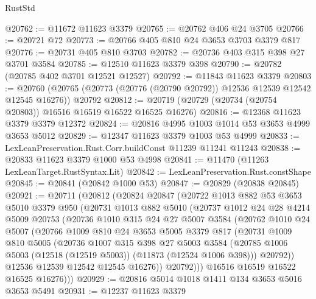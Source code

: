 \begin{lexlean}{RustStd}
\begin{coremodule}
@20762 := @11672 @11623 @3379
@20765 := @20762 @406 @24 @3705
@20766 := @20721 @72
@20773 := @20766 @405 @810 @24 @3653 @3703 @3379 @817
@20776 := @20731 @405 @810 @3703
@20782 := @20736 @403 @315 @398 @27 @3701 @3584
@20785 := @12510 @11623 @3379 @398
@20790 := @20782 (@20785 @402 @3701 @12521 @12527)
@20792 := @11843 @11623 @3379
@20803 := @20760
    (@20765 (@20773 (@20776 (@20790 @20792)) @12536 @12539 @12542 @12545 @16276))
    @20792
@20812 := @20719 (@20729 (@20734 (@20754 @20803)) @16516 @16519 @16522 @16525 @16276)
@20816 := @12368 @11623 @3379 @3379 @12372
@20824 := @20816 @4995 @1003 @1014 @53 @3653 @4999 @3653 @5012
@20829 := @12347 @11623 @3379 @1003 @53 @4999
@20833 := LexLeanPreservation.Rust.Corr.buildConst @11239 @11241 @11243
@20838 := @20833 @11623 @3379 @1000 @53 @4998
@20841 := @11470 (@11263 LexLeanTarget.RustSyntax.Lit)
@20842 := LexLeanPreservation.Rust.constShape
@20845 := @20841 (@20842 @1000 @53)
@20847 := @20829 (@20838 @20845)
@20921 := @20711
    (@20812
      (@20824
        @20847
        (@20722
          @1013
          @882
          @53
          @3653
          @5010
          @3379
          @950
          (@20731
            @1013
            @882
            @5010
            (@20737
              @1012
              @24
              @28
              @4214
              @5009
              @20753
              (@20736
                @1010
                @315
                @24
                @27
                @5007
                @3584
                (@20762
                  @1010
                  @24
                  @5007
                  (@20766
                    @1009
                    @810
                    @24
                    @3653
                    @5005
                    @3379
                    @817
                    (@20731
                      @1009
                      @810
                      @5005
                      (@20736
                        @1007
                        @315
                        @398
                        @27
                        @5003
                        @3584
                        (@20785 @1006 @5003 (@12518 (@12519 @5003)) (@11873 (@12524 @1006 @398)))
                        @20792))
                    @12536
                    @12539
                    @12542
                    @12545
                    @16276))
                @20792)))
          @16516
          @16519
          @16522
          @16525
          @16276)))
@20929 := @20816 @5014 @1018 @1411 @134 @3653 @5016 @3653 @5491
@20931 := @12237 @11623 @3379

\end{coremodule}
\end{lexlean}
